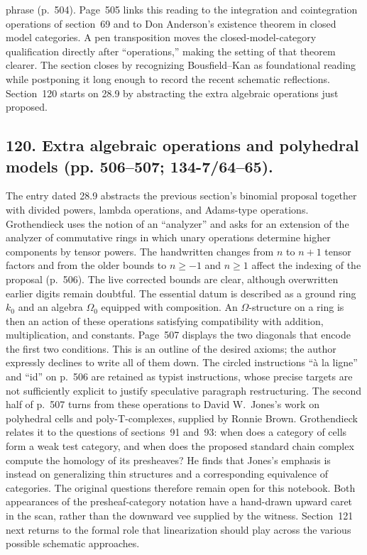 \documentclass[10pt,oneside]{book}
\begin{document}
phrase (p.~504). Page~505 links this reading to the integration and cointegration operations of section~69 and to Don Anderson's existence theorem in closed model categories. A pen transposition moves the closed-model-category qualification directly after ``operations,'' making the setting of that theorem clearer. The section closes by recognizing Bousfield--Kan as foundational reading while postponing it long enough to record the recent schematic reflections. Section~120 starts on 28.9 by abstracting the extra algebraic operations just proposed.

\subsection*{120. Extra algebraic operations and polyhedral models (pp. 506--507; 134-7/64--65).}
The entry dated 28.9 abstracts the previous section's binomial proposal together with divided powers, lambda operations, and Adams-type operations. Grothendieck uses the notion of an ``analyzer'' and asks for an extension of the analyzer of commutative rings in which unary operations determine higher components by tensor powers. The handwritten changes from $n$ to $n+1$ tensor factors and from the older bounds to $n\geq-1$ and $n\geq1$ affect the indexing of the proposal (p.~506). The live corrected bounds are clear, although overwritten earlier digits remain doubtful. The essential datum is described as a ground ring $k_0$ and an algebra $\Omega_0$ equipped with composition. An $\Omega$-structure on a ring is then an action of these operations satisfying compatibility with addition, multiplication, and constants. Page~507 displays the two diagonals that encode the first two conditions. This is an outline of the desired axioms; the author expressly declines to write all of them down. The circled instructions ``\`a la ligne'' and ``id'' on p.~506 are retained as typist instructions, whose precise targets are not sufficiently explicit to justify speculative paragraph restructuring. The second half of p.~507 turns from these operations to David W.~Jones's work on polyhedral cells and poly-T-complexes, supplied by Ronnie Brown. Grothendieck relates it to the questions of sections~91 and~93: when does a category of cells form a weak test category, and when does the proposed standard chain complex compute the homology of its presheaves? He finds that Jones's emphasis is instead on generalizing thin structures and a corresponding equivalence of categories. The original questions therefore remain open for this notebook. Both appearances of the presheaf-category notation have a hand-drawn upward caret in the scan, rather than the downward vee supplied by the witness. Section~121 next returns to the formal role that linearization should play across the various possible schematic approaches.
\end{document}
